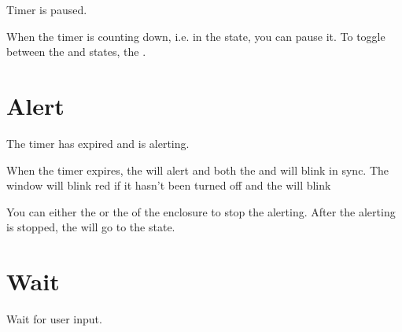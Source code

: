 Timer is paused.

\par\medskip

When the timer is counting down, i.e. in the  state, you can pause it.
To toggle between the  and  states,  the .


\section{Alert} 

The timer has expired and is alerting.

\par\medskip

When the timer expires, the  will alert and both the  and 
will blink in sync. The  window will blink red if it hasn't been turned
off and the  will blink

\begin{figure}[H]
\centering
\end{figure}

You can either  the  or  the  of the enclosure to
stop the alerting.  After the alerting is stopped, the  will go to the
 state.


\section{Wait} 

Wait for user input.

\par\medskip

